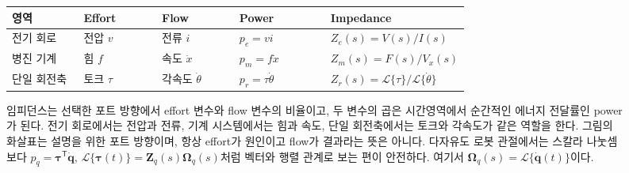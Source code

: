 \begin{figure}[!htbp]
  \centering
  \small
  \renewcommand{\arraystretch}{1.35}
  \begin{tabularx}{\linewidth}{
      >{\raggedright\arraybackslash}p{0.17\linewidth}
      >{\raggedright\arraybackslash}p{0.18\linewidth}
      >{\raggedright\arraybackslash}p{0.18\linewidth}
      >{\raggedright\arraybackslash}p{0.21\linewidth}
      >{\raggedright\arraybackslash}X}
    \toprule
    영역 & Effort & Flow & Power & Impedance \\
    \midrule
    전기 회로
      & 전압 $v$
      & 전류 $i$
      & $p_e=vi$
      & $Z_e(s)=V(s)/I(s)$ \\
    병진 기계
      & 힘 $f$
      & 속도 $\dot{x}$
      & $p_m=f\dot{x}$
      & $Z_m(s)=F(s)/V_x(s)$ \\
    단일 회전축
      & 토크 $\tau$
      & 각속도 $\dot{\theta}$
      & $p_r=\tau\dot{\theta}$
      & $Z_r(s)=\mathcal{L}\{\tau\}/\mathcal{L}\{\dot{\theta}\}$ \\
    \bottomrule
  \end{tabularx}

  \vspace{2mm}

  \caption{임피던스는 선택한 포트 방향에서 effort 변수와 flow 변수의 비율이고, 두 변수의 곱은 시간영역에서 순간적인 에너지 전달률인 power가 된다. 전기 회로에서는 전압과 전류, 기계 시스템에서는 힘과 속도, 단일 회전축에서는 토크와 각속도가 같은 역할을 한다. 그림의 화살표는 설명을 위한 포트 방향이며, 항상 effort가 원인이고 flow가 결과라는 뜻은 아니다. 다자유도 로봇 관절에서는 스칼라 나눗셈보다 $p_q=\bm{\tau}^{\mathsf T}\dot{\bm q}$, $\mathcal{L}\{\bm{\tau}(t)\}=\bm{Z}_q(s)\bm{\Omega}_q(s)$처럼 벡터와 행렬 관계로 보는 편이 안전하다. 여기서 $\bm{\Omega}_q(s)=\mathcal{L}\{\dot{\bm{q}}(t)\}$이다.}
  \label{fig:effort-flow-power}
\end{figure}
